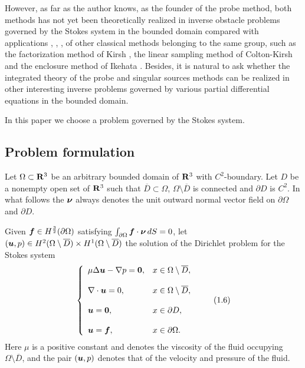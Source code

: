 However, as far as the author knows, as the founder of the probe method, 
both methods has not yet been theoretically realized 
in inverse obstacle problems governed by the Stokes system in the bounded domain compared with applications
\cite{LR}, \cite{LY}, \cite{MS}, \cite{HUW}
of other classical methods belonging to the same group, such as
the factorization method of Kirsh \cite{K}, the linear sampling method of Colton-Kirsh \cite{CKi}
and the enclosure method of Ikehata \cite{IEn}.
Besides, it is natural to ask whether the integrated theory of the probe and singular sources 
methods can be realized in other interesting inverse problems governed by various partial differential equations
in the bounded domain.

In this paper we choose a problem governed by the Stokes system.




























\subsection{Problem formulation}

Let $\Omega\subset\Bbb R^3$ be an arbitrary bounded domain of $\Bbb R^3$ with $C^2$-boundary.
Let $D$ be a nonempty open set of $\Bbb R^3$ such that $\overline{D}\subset\Omega$,
$\Omega\setminus\overline{D}$ is connected and $\partial D$ is $C^2$.
In what follows the $\mbox{\boldmath $\nu$}$ always denotes the unit outward normal vector field on $\partial\Omega$ and $\partial D$.

Given $\mbox{\boldmath $f$}\in H^{\frac{3}{2}}(\partial\Omega)$ satisfying $\int_{\partial\Omega}\mbox{\boldmath $f$}\cdot\mbox{\boldmath $\nu$}\,dS=0$, let
 $(\mbox{\boldmath $u$},p)\in H^2(\Omega\setminus\overline{D})\times H^1(\Omega\setminus\overline{D})$
 the solution of  the Dirichlet problem for the Stokes system
 $$\left\{
 \begin{array}{ll}
 \mu\Delta\mbox{\boldmath $u$}-\nabla p=\mbox{\boldmath $0$}, & x\in\Omega\setminus\overline{D},
 \\
 \\
 \displaystyle
 \nabla\cdot\mbox{\boldmath $u$}=0, &  x\in\Omega\setminus\overline{D},\\
 \\
 \displaystyle
 \mbox{\boldmath $u$}=\mbox{\boldmath $0$}, & x\in\partial D,
 \\
 \\
 \displaystyle
 \mbox{\boldmath $u$}=\mbox{\boldmath $f$}, & x\in\partial\Omega.
 \end{array}
 \right.
 \tag {1.6}
 $$
Here $\mu$ is a positive constant and denotes the viscosity of the fluid occupying $\Omega\setminus\overline{D}$,
and the pair $(\mbox{\boldmath $u$},p)$  denotes that of the velocity and pressure of the fluid.


